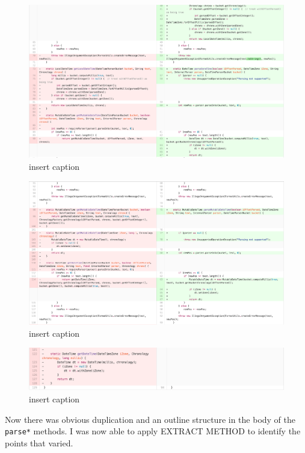 \begin{figure}[H]
	\centering
	\includegraphics[width=\linewidth]{code82}
	\caption{insert caption}
\end{figure}
\begin{figure}[H]
	\centering
	\includegraphics[width=\linewidth]{code83}
	\caption{insert caption}
\end{figure}
\begin{figure}[H]
	\centering
	\includegraphics[width=\linewidth]{code84}
	\caption{insert caption}
\end{figure}

Now there was obvious duplication and an outline structure in the body of the \texttt{parse*} methods. I was now able to apply EXTRACT METHOD to identify the points that varied.

